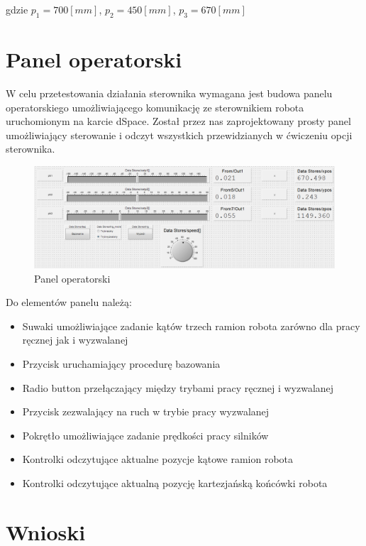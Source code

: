 \documentclass[12pt]{article}
\begin{document}
gdzie $p_1=700[mm]$, $p_2=450[mm]$, $p_3=670[mm]$

\newpage

\section{Panel operatorski}

W celu przetestowania działania sterownika wymagana jest budowa panelu
operatorskiego umożliwiającego komunikację ze sterownikiem robota uruchomionym
na karcie dSpace. Został przez nas zaprojektowany prosty panel umożliwiający
sterowanie i odczyt wszystkich przewidzianych w ćwiczeniu opcji sterownika.

\begin{figure}[!htb]
    \begin{center}
        \includegraphics[width=17cm]
        {../res/img/panel.png}
    \end{center}
    \caption{Panel operatorski}
\end{figure}

Do elementów panelu należą:

\begin{itemize}
  \item Suwaki umożliwiające zadanie kątów trzech ramion robota zarówno dla
  pracy ręcznej jak i wyzwalanej
  \item Przycisk uruchamiający procedurę bazowania
  \item Radio button przełączający między trybami pracy ręcznej i wyzwalanej
  \item Przycisk zezwalający na ruch w trybie pracy wyzwalanej
  \item Pokrętło umożliwiające zadanie prędkości pracy silników
  \item Kontrolki odczytujące aktualne pozycje kątowe ramion robota
  \item Kontrolki odczytujące aktualną pozycję kartezjańską końcówki robota 
\end{itemize}

\section{Wnioski}
\end{document}
